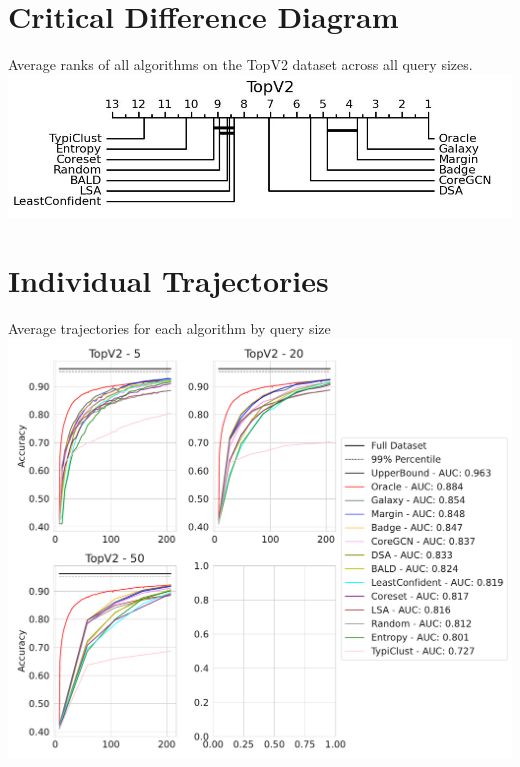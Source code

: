 \documentclass[]{article}
\begin{document}
\section{Critical Difference Diagram}
Average ranks of all algorithms on the TopV2 dataset across all query sizes. \\
\includegraphics[width=0.7\linewidth]{img/micro_topv2.jpg}

\section{Individual Trajectories}
Average trajectories for each algorithm by query size \\
\includegraphics[width=0.9\linewidth]{img/eval_topv2.pdf}
\end{document}
